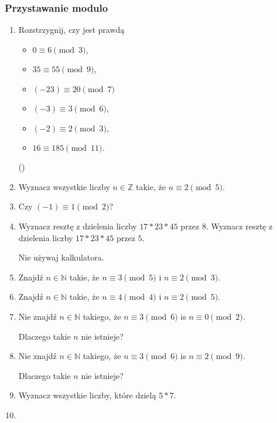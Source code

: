 \documentclass[12pt]{article}
\newcommand{\bbZ}{\mathbb{Z}}
\newcommand{\NN}{\mathbb{N}}
\begin{document}
\subsubsection{Przystawanie modulo}\label{subsec:modulo}
\begin{enumerate}
	\item Rozstrzygnij, czy jest prawdą
	\begin{itemize}
		\item
		$0 \equiv 6 \pmod 3$,
		\item
		$35 \equiv 55 \pmod 9$,
		\item  $(-23) \equiv 20 \pmod 7$
		\item $(-3) \equiv 3 \pmod 6$,
		\item $(-2) \equiv 2 \pmod 3$,
		\item $16 \equiv 185 \pmod 11.$
	\end{itemize}
	(\cite[sec. 6.1, p. 154]{Forman.2015})
	
	
	
	\item
	Wyznacz wszystkie liczby $n\in \bbZ$ takie, że
	$n\equiv 2 \pmod 5$.
	\item 
	Czy $(-1)\equiv 1 \pmod 2$?
	
	\item Wyznacz resztę z dzielenia liczby $17*23*45$ przez $8$.
	Wyznacz resztę z dzielenia liczby $17*23*45$ przez $5$.
	
	Nie używaj kalkulatora.
	
	\item Znajdź $n\in \NN$ takie, że $n\equiv 3 \pmod 5$ i 
	$n\equiv 2 \pmod 3$.
	
	\item Znajdź $n\in \NN$ takie, że $n\equiv 4 \pmod 4$ i 
	$n\equiv 2 \pmod 5$.
	
	\item Nie znajdź $n\in \NN$ takiego, że
	$n\equiv 3 \pmod 6$ is $n\equiv 0 \pmod 2$.
	
	Dlaczego takie $n$ nie istnieje?
	
	\item Nie znajdź $n\in \NN$ takiego, że
	$n\equiv 3 \pmod 6$ is $n\equiv 2 \pmod 9$.
	
	Dlaczego takie $n$ nie istnieje?
	
	\item Wyznacz wszystkie liczby, które dzielą $5*7$. 
	
	
	\item \label{exc:modpowers}
	

\end{enumerate}
\end{document}
